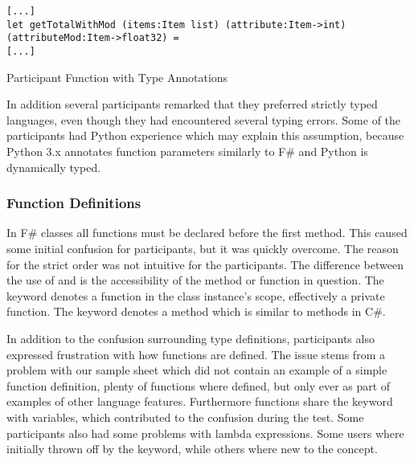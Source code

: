 \begin{listing}[H]
\begin{verbatim}
[...]
let getTotalWithMod (items:Item list) (attribute:Item->int) (attributeMod:Item->float32) =
[...]
\end{verbatim}
\caption{Participant Function with Type Annotations}
\label{lst:part-func}
\end{listing}

In addition several participants remarked that they preferred strictly typed languages, even though they had encountered several typing errors. Some of the participants had Python experience which may explain this assumption, because Python 3.x annotates function parameters similarly to F\# and Python is dynamically typed.

\subsubsection{Function Definitions}
In F\# classes all functions must be declared before the first method. This caused some initial confusion for participants, but it was quickly overcome. The reason for the strict order was not intuitive for the participants. The difference between the use of  and  is the accessibility of the method or function in question. The  keyword denotes a function in the class instance's scope, effectively a private function. The  keyword denotes a method which is similar to methods in C\#.

In addition to the confusion surrounding type definitions, participants also expressed frustration with how functions are defined. The issue stems from a problem with our sample sheet which did not contain an example of a simple function definition, plenty of functions where defined, but only ever as part of examples of other language features. Furthermore functions share the  keyword with variables, which contributed to the confusion during the test. Some participants also had some problems with lambda expressions. Some users where initially thrown off by the  keyword, while others where new to the concept.



